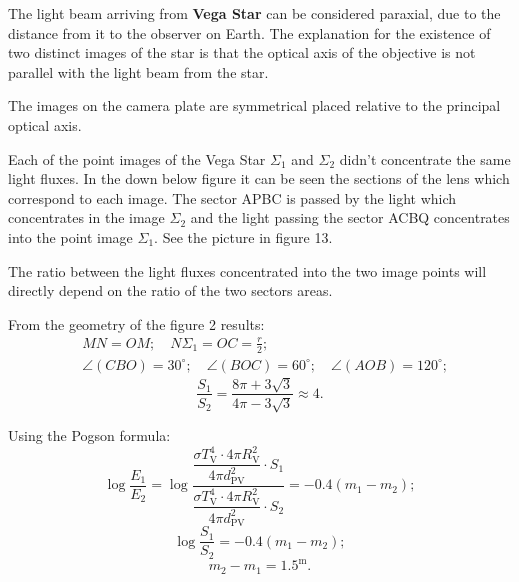 The light beam arriving from \textbf{Vega Star} can be considered paraxial,
due to the distance from it to the observer on Earth. The explanation for the
existence of two distinct images of the star is that the optical axis of the
objective is not parallel with the light beam from the star.

The images on the camera plate are symmetrical placed relative to the
principal optical axis.


Each of the point images of the Vega Star $\Sigma_1$ and $\Sigma_2$ didn't
concentrate the same light fluxes. In the down below figure it can be seen
the sections of the lens which correspond to each image. The sector APBC is
passed by the light which concentrates in the image $\Sigma_2$ and the light
passing the sector ACBQ concentrates into the point image $\Sigma_1$. See the
picture in figure 13.


The ratio between the light fluxes concentrated into the two image points
will directly depend on the ratio of the two sectors areas.

From the geometry of the figure 2 results:
\begin{align*}
&MN = OM;\quad N\Sigma_1 = OC = \frac{r}{2};\\
&\angle(CBO) = 30^\circ;\quad \angle(BOC) = 60^\circ;\quad
 \angle(AOB) = 120^\circ;
\end{align*}
\[
\frac{S_1}{S_2} = \frac{8\pi + 3\sqrt{3}}{4\pi - 3\sqrt{3}} \approx 4.
\]

Using the Pogson formula:
\[
\log\frac{E_1}{E_2}
 = \log\frac{\dfrac{\sigma T_{\mathrm{V}}^4 \cdot 4\pi R_{\mathrm{V}}^2}
                   {4\pi d_{\mathrm{PV}}^2} \cdot S_1}
            {\dfrac{\sigma T_{\mathrm{V}}^4 \cdot 4\pi R_{\mathrm{V}}^2}
                   {4\pi d_{\mathrm{PV}}^2} \cdot S_2}
 = -0.4(m_1 - m_2);
\]
\[
\log\frac{S_1}{S_2} = -0.4(m_1 - m_2);
\]
\[
m_2 - m_1 = 1.5^{\mathrm{m}}.
\]
